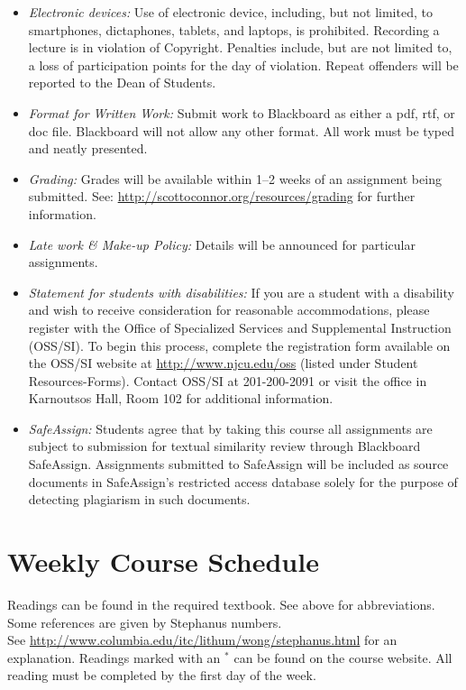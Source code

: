 \documentclass[article,oneside]{memoir}
\begin{document}
\begin{itemize}
\item \textit{Electronic devices:} Use of electronic device, including, but not limited, to smartphones, dictaphones, tablets, and laptops, is prohibited. Recording a lecture is in violation of Copyright. Penalties include, but are not limited to, a loss of participation points for the day of violation. Repeat offenders will be reported to the Dean of Students.

\item \textit{Format for Written Work:} Submit work to Blackboard as either a pdf, rtf, or doc file. Blackboard will not allow any other format. All work must be typed and neatly presented. 


\item \textit{Grading:} Grades will be available within 1--2 weeks of an assignment being submitted. See: \href{http://scottoconnor.org/resources/grading}{http://scottoconnor.org/resources/grading} for further information.


\item \textit{Late work \& Make-up Policy:} Details will be announced for particular assignments.

\item \textit{Statement for students with disabilities:} If you are a student
with a disability and wish to receive consideration for reasonable
accommodations, please register with the Office of Specialized Services
and Supplemental Instruction (OSS/SI). To begin this process, complete
the registration form available on the OSS/SI website at
\href{http://www.njcu.edu/oss}{http://www.njcu.edu/oss}
(listed under Student Resources-Forms). Contact OSS/SI at 201-200-2091
or visit the office in Karnoutsos Hall, Room 102 for additional
information.



\item \textit{SafeAssign:} Students agree that by taking this course all assignments are subject to submission for textual similarity review through Blackboard SafeAssign. Assignments submitted to SafeAssign will be included as source documents in SafeAssign's restricted access database solely for the purpose of detecting plagiarism in such documents.  


\end{itemize}





\section{Weekly Course Schedule}
Readings can be found in the required textbook. See above for abbreviations. Some references are given by Stephanus numbers.\\ See \href{http://www.columbia.edu/itc/lithum/wong/stephanus.html}{http://www.columbia.edu/itc/lithum/wong/stephanus.html} for an explanation. Readings marked with an $^{*}$ can be found on the course website. All reading must be completed by the first day of the week.
\end{document}
